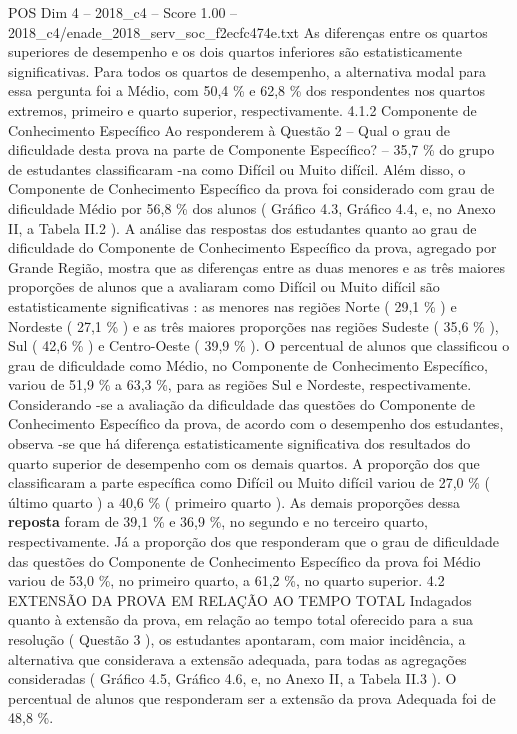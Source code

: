\begin{textsample}{POS Dim 4 – 2018\_c4 – Score 1.00 – 2018\_c4/enade\_2018\_serv\_soc\_f2ecfc474e.txt}
As diferenças entre os quartos superiores de desempenho e os dois quartos inferiores são estatisticamente significativas.
Para todos os quartos de desempenho, a alternativa modal para essa pergunta foi a Médio, com 50,4 \% e 62,8 \% dos respondentes nos quartos extremos, primeiro e quarto superior, respectivamente. 4.1.2 Componente de Conhecimento Específico Ao responderem à Questão 2 – Qual o grau de dificuldade desta prova na parte de Componente Específico? – 35,7 \% do grupo de estudantes classificaram -na como Difícil ou Muito difícil.
Além disso, o Componente de Conhecimento Específico da prova foi considerado com grau de dificuldade Médio por 56,8 \% dos alunos ( Gráfico 4.3, Gráfico 4.4, e, no Anexo II, a Tabela II.2 ).
A análise das respostas dos estudantes quanto ao grau de dificuldade do Componente de Conhecimento Específico da prova, agregado por Grande Região, mostra que as diferenças entre as duas menores e as três maiores proporções de alunos que a avaliaram como Difícil ou Muito difícil são estatisticamente significativas : as menores nas regiões Norte ( 29,1 \% ) e Nordeste ( 27,1 \% ) e as três maiores proporções nas regiões Sudeste ( 35,6 \% ), Sul ( 42,6 \% ) e Centro-Oeste ( 39,9 \% ).
O percentual de alunos que classificou o grau de dificuldade como Médio, no Componente de Conhecimento Específico, variou de 51,9 \% a 63,3 \%, para as regiões Sul e Nordeste, respectivamente.
Considerando -se a avaliação da dificuldade das questões do Componente de Conhecimento Específico da prova, de acordo com o desempenho dos estudantes, observa -se que há diferença estatisticamente significativa dos resultados do quarto superior de desempenho com os demais quartos.
A proporção dos que classificaram a parte específica como Difícil ou Muito difícil variou de 27,0 \% ( último quarto ) a 40,6 \% ( primeiro quarto ).
As demais proporções dessa \textbf{reposta} foram de 39,1 \% e 36,9 \%, no segundo e no terceiro quarto, respectivamente.
Já a proporção dos que responderam que o grau de dificuldade das questões do Componente de Conhecimento Específico da prova foi Médio variou de 53,0 \%, no primeiro quarto, a 61,2 \%, no quarto superior. 4.2 EXTENSÃO DA PROVA EM RELAÇÃO AO TEMPO TOTAL Indagados quanto à extensão da prova, em relação ao tempo total oferecido para a sua resolução ( Questão 3 ), os estudantes apontaram, com maior incidência, a alternativa que considerava a extensão adequada, para todas as agregações consideradas ( Gráfico 4.5, Gráfico 4.6, e, no Anexo II, a Tabela II.3 ).
O percentual de alunos que responderam ser a extensão da prova Adequada foi de 48,8 \%.

\end{textsample}
